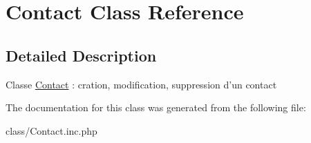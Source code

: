 \hypertarget{class_contact}{
\section{Contact Class Reference}
\label{class_contact}
}


\subsection{Detailed Description}
Classe \hyperlink{class_contact}{Contact} : cration, modification, suppression d'un contact 

The documentation for this class was generated from the following file:\begin{DoxyCompactItemize}
\item 
class/Contact.inc.php\end{DoxyCompactItemize}
